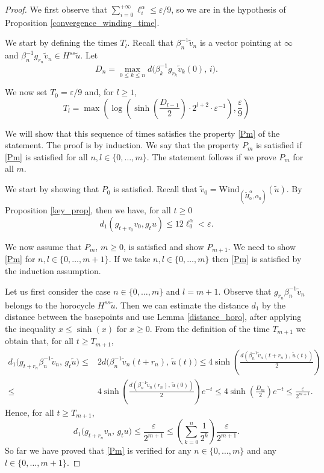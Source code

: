 \documentclass[10pt,a4paper]{amsart}
\begin{document}
\begin{proof}
	We first observe that $\sum_{i=0}^{+\infty}\ell^{\alpha}_{i}\le \varepsilon/9$, so we are in the hypothesis of Proposition \ref{convergence_winding_time}.
	
	We start by defining the times $T_l$. 
	Recall that $\beta_n^{-1}\tilde v_n$ is a vector pointing at $\infty$
	and $\beta_n^{-1} g_{r_n}\tilde v_n \in H^{ss} \tilde u$.
	Let
	\[
	D_n = \max_{0 \le k \le n}
	d\big(\beta_k^{-1} g_{r_k}\tilde v_k(0),\, i\big).
	\]
	
	We now set $T_0 = \varepsilon/ 9$ and, for $l \ge 1$,
	\[
	T_l
	= \max \left(
	\log\!\left(
	\sinh\!\left(\frac{D_{l-1}}{2}\right)\cdot 2^{l+2} \cdot \varepsilon^{-1}
	\right), \frac{\varepsilon}{9} \right)
	\]
	
	We will show that this sequence of times satisfies the property \ref{Pm}
	of the statement.
	The proof is by induction. We say that the property $P_m$ is satisfied
	if \ref{Pm} is satisfied for all $n,l \in \{0,\dots,m\}$.
	The statement follows if we prove $P_m$ for all $m$.
	
	We start by showing that $P_0$ is satisfied.
	Recall that $\tilde v_0 = \mathrm{Wind}_{(\tilde H^{\alpha}_0, \alpha_0)}(\tilde u)$. By Proposition \ref{key_prop}, then we have, for all $t\ge 0$
	\[
	d_1(g_{t+r_0}v_0, g_t u) \le  12 \ell^{\alpha}_0 < \varepsilon.
	\]
	
	
	We now assume that $P_m$, $m\ge0$, is satisfied and show $P_{m+1}$. We need to show \ref{Pm} for $n,l\in \{0,\dots,m+1\}$. If we take $n,l\in \{0,\dots,m\}$ then \ref{Pm} is satisfied by the induction assumption.
	
	Let us first consider the case $n \in \{0,\dots,m\}$ and $l=m+1$. Observe that $g_{r_n} \beta_n^{-1}\tilde v_n$ belongs to the horocycle $H^{ss}\tilde u$. Then we can estimate the distance $d_1$ by the distance between the basepoints and use Lemma \ref{distance_horo}, after applying the inequality $x\le \sinh(x)$ for $x\ge0$. From the definition of the time $T_{m+1}$ we obtain that, for all $t\ge T_{m+1}$, 
	\begin{align*}
		d_1\big(g_{t+r_n} \beta_n^{-1} \tilde v_n,\, g_t \tilde u\big) \le & 
		2 d\big( \beta_n^{-1} \tilde v_n (t+r_n),\, \tilde u (t) \big) \le 
		4 \sinh (\frac{d( \beta_n^{-1} \tilde v_n (t+r_n),\, \tilde u (t) )}{2}) \\
		\le & 4 \sinh (\frac{d( \beta_n^{-1} \tilde v_n (r_n),\, \tilde u (0) )}{2}) e^{-t} \le 4 \sinh(\frac{D_m}{2}) e^{-t}	\le \frac{\varepsilon}{2^{m+1}}.	
	\end{align*}
Hence, for all $t\ge T_{m+1}$,
\[
d_1\big(g_{t+r_n} v_n,\, g_t u\big) \le \frac{\varepsilon}{2^{m+1}} \le \left(\sum_{k=0}^{n} \frac{1}{2^k}\right)\frac{\varepsilon}{2^{m+1}}.
\]
So far we have proved that \ref{Pm} is verified for any $n\in\{0,\dots,m\}$ and any $l\in \{0,\dots,m+1\}$. 


\end{proof}
\end{document}
